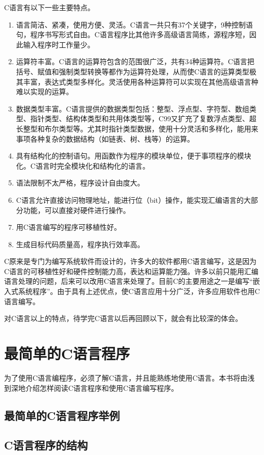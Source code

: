 C语言有以下一些主要特点。
\begin{enumerate}
	\item 语言简洁、紧凑，使用方便、灵活。C语言一共只有37个关键字，9种控制语句，程序书写形式自由。C语言程序比其他许多高级语言简练，源程序短，因此输入程序时工作量少。
	\item 运算符丰富。C语言的运算符包含的范围很广泛，共有34种运算符。C语言把括号、赋值和强制类型转换等都作为运算符处理，从而使C语言的运算类型极其丰富，表达式类型多样化。灵活使用各种运算符可以实现在其他高级语言种难以实现的运算。
	\item 数据类型丰富。C语言提供的数据类型包括：整型、浮点型、字符型、数组类型、指针类型、结构体类型和共用体类型等，C99又扩充了复数浮点类型、超长整型和布尔类型等。尤其时指针类型数据，使用十分灵活和多样化，能用来事项各种复杂的数据结构（如链表、树、栈等）的运算。
	\item 具有结构化的控制语句。用函数作为程序的模块单位，便于事项程序的模块化。C语言时完全模块化和结构化的语言。
	\item 语法限制不太严格，程序设计自由度大。
	\item C语言允许直接访问物理地址，能进行位（bit）操作，能实现汇编语言的大部分功能，可以直接对硬件进行操作。
	\item 用C语言编写的程序可移植性好。
	\item 生成目标代码质量高，程序执行效率高。
\end{enumerate}

C原来是专门为编写系统软件而设计的，许多大的软件都用C语言编写，这是因为C语言的可移植性好和硬件控制能力高，表达和运算能力强。许多以前只能用汇编语言处理的问题，后来可以改用C语言来处理了。目前C的主要用途之一是编写“嵌入式系统程序”。由于具有上述优点，使C语言应用十分广泛，许多应用软件也用C语言编写。

对C语言以上的特点，待学完C语言以后再回顾以下，就会有比较深的体会。

\section{最简单的C语言程序}

为了使用C语言编程序，必须了解C语言，并且能熟练地使用C语言。本书将由浅到深地介绍怎样阅读C语言程序和使用C语言编写程序。

\subsection{最简单的C语言程序举例}

\subsection{C语言程序的结构}

